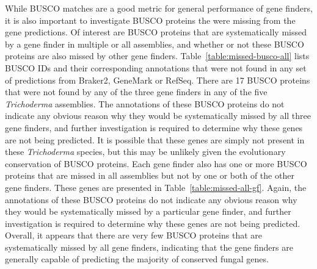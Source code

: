 While BUSCO matches are a good metric for general performance of gene
finders, it is also important to investigate BUSCO proteins the were missing from the gene predictions. Of interest are BUSCO proteins that are systematically missed by a gene finder in multiple or all assemblies, and whether or not these BUSCO proteins are also missed by other gene finders. Table~\ref{table:missed-busco-all} lists BUSCO IDs and their corresponding annotations that were not found in any set of predictions from Braker2, GeneMark or RefSeq. There are 17 BUSCO proteins that were not found by any of the three gene finders in any of the five \textit{Trichoderma} assemblies. The annotations of these BUSCO proteins do not indicate any obvious reason why they would be systematically missed by all three gene finders, and further investigation is required to determine why these genes are not being predicted. It is possible that these genes are simply not present in these \textit{Trichoderma} species, but this may be unlikely given the evolutionary conservation of BUSCO proteins. Each gene finder also has one or more BUSCO proteins that are missed in all assemblies but not by one or both of the other gene finders. These genes are presented in Table~\ref{table:missed-all-gf}. Again, the annotations of these BUSCO proteins do not indicate any obvious reason why they would be systematically missed by a particular gene finder, and further investigation is required to determine why these genes are not being predicted. Overall, it appears that there are very few BUSCO proteins that are systematically missed by all gene finders, indicating that the gene finders are generally capable of predicting the majority of conserved fungal genes.


